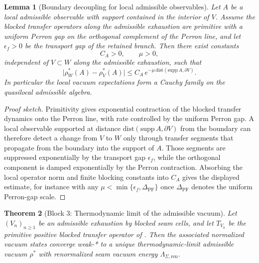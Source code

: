 \documentclass[11pt,a4paper]{article}
\newtheorem{theorem}{Theorem}[section]
\newtheorem{lemma}[theorem]{Lemma}
\theoremstyle{definition}
\theoremstyle{remark}
\newcommand{\Seam}{\Sigma}
\begin{document}
\begin{lemma}[Boundary decoupling for local admissible observables]
\label{lem:boundary-decoupling-admissible}
Let $A$ be a local admissible observable with support contained in the interior of $V$. Assume the
blocked transfer operators along the admissible exhaustion are primitive with a uniform Perron gap
on the orthogonal complement of the Perron line, and let $\epsilon_f>0$ be the transport gap of the
retained branch. Then there exist constants
\[
C_A>0,
\qquad
\mu>0,
\]
independent of $V\subset W$ along the admissible exhaustion, such that
\[
\bigl|\rho_W^\ast(A)-\rho_V^\ast(A)\bigr|
\le
C_A\,e^{-\mu\,\mathrm{dist}(\mathrm{supp}\,A,\partial V)}.
\]
In particular the local vacuum expectations form a Cauchy family on the quasilocal admissible
algebra.
\end{lemma}

\begin{proof}[Proof sketch]
Primitivity gives exponential contraction of the blocked transfer dynamics onto the Perron line,
with rate controlled by the uniform Perron gap. A local observable supported at distance
$\mathrm{dist}(\mathrm{supp}\,A,\partial V)$ from the boundary can therefore detect a change from
$V$ to $W$ only through transfer segments that propagate from the boundary into the support of $A$.
Those segments are suppressed exponentially by the transport gap $\epsilon_f$, while the orthogonal
component is damped exponentially by the Perron contraction. Absorbing the local operator norm and
finite blocking constants into $C_A$ gives the displayed estimate, for instance with any
$\mu<\min\{\epsilon_f,\Delta_{\mathrm{PF}}\}$ once $\Delta_{\mathrm{PF}}$ denotes the uniform
Perron-gap scale.
\end{proof}

\begin{theorem}[Block 3: Thermodynamic limit of the admissible vacuum]
\label{thm:thermodynamic-limit}
Let $(V_n)_{n\ge1}$ be an admissible exhaustion by blocked seam cells, and let $T_{V_n}$ be the
primitive positive blocked transfer operator of . Then the
associated normalized vacuum states converge weak-* to a unique thermodynamic-limit admissible
vacuum $\rho^\ast$ with renormalized seam vacuum energy $\Lambda_{\Seam,\mathrm{ren}}$.
\end{theorem}
\end{document}
